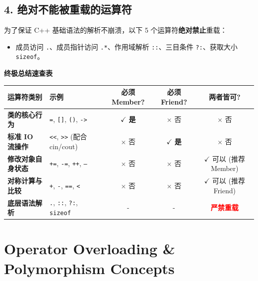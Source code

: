 \documentclass[11pt, a4paper]{article}
\begin{document}
\subsection*{4. 绝对不能被重载的运算符}
为了保证 C++ 基础语法的解析不崩溃，以下 5 个运算符\textbf{绝对禁止}重载：
\begin{itemize}
    \item 成员访问 \texttt{.}、成员指针访问 \texttt{.*}、作用域解析 \texttt{::}、三目条件 \texttt{?:}、获取大小 \texttt{sizeof}。
\end{itemize}

\vspace{1.5em}

\noindent \textbf{终极总结速查表}

\begin{table}[h]
    \centering
    \renewcommand{\arraystretch}{1.5} %
    \begin{tabular}{@{} l l c c c @{}}
        \toprule
        \textbf{运算符类别} & \textbf{示例} & \textbf{必须 Member?} & \textbf{必须 Friend?} & \textbf{两者皆可?} \\
        \midrule
        \textbf{类的核心行为} & \texttt{=}, \texttt{[]}, \texttt{()}, \texttt{->} & $\checkmark$ \textbf{是} & $\times$ 否 & $\times$ 否 \\
        \textbf{标准 IO 流操作} & \texttt{<<}, \texttt{>>} (配合 cin/cout) & $\times$ 否 & $\checkmark$ \textbf{是} & $\times$ 否 \\
        \textbf{修改对象自身状态} & \texttt{+=}, \texttt{-=}, \texttt{++}, \texttt{--} & $\times$ 否 & $\times$ 否 & $\checkmark$ 可以 (推荐 Member) \\
        \textbf{对称计算与比较} & \texttt{+}, \texttt{-}, \texttt{==}, \texttt{<} & $\times$ 否 & $\times$ 否 & $\checkmark$ 可以 (推荐 Friend) \\
        \textbf{底层语法解析} & \texttt{.}, \texttt{::}, \texttt{?:}, \texttt{sizeof} & - & - & \textcolor{red}{\textbf{严禁重载}} \\
        \bottomrule
    \end{tabular}
\end{table}
\newpage
\section{Operator Overloading \& Polymorphism Concepts}
\end{document}
